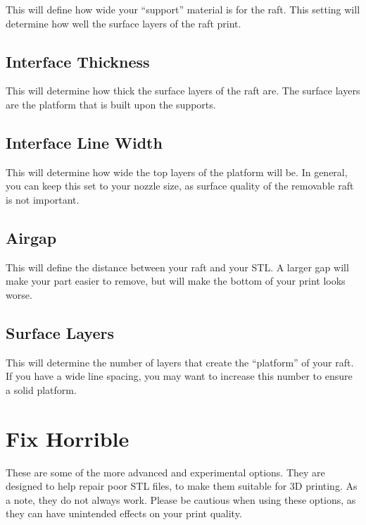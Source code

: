 This will define how wide your “support” material is for the raft. This setting will determine how well the surface layers of the raft print.

\subsection{Interface Thickness}

This will determine how thick the surface layers of the raft are. The surface layers are the platform that is built upon the supports.

\subsection{Interface Line Width}

This will determine how wide the top layers of the platform will be. In general, you can keep this set to your nozzle size, as surface quality of the removable raft is not important.

\subsection{Airgap}

This will define the distance between your raft and your STL. A larger gap will make your part easier to remove, but will make the bottom of your print looks worse.

\subsection{Surface Layers}

This will determine the number of layers that create the “platform” of your raft. If you have a wide line spacing, you may want to increase this number to ensure a solid platform. 

\section{Fix Horrible}

These are some of the more advanced and experimental options. They are designed to help repair poor STL files, to make them suitable for 3D printing. As a note, they do not always work. Please be cautious when using these options, as they can have unintended effects on your print quality.

